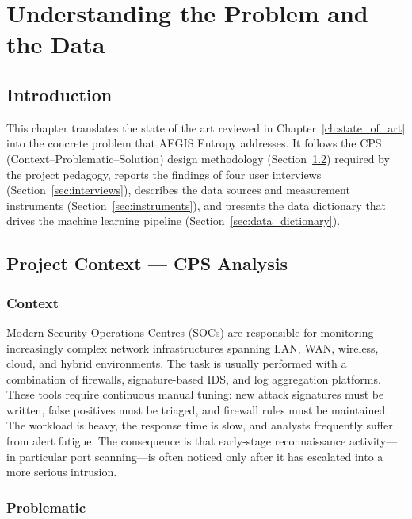 
\chapter{Understanding the Problem and the Data}\label{ch:understanding}

\section{Introduction}

This chapter translates the state of the art reviewed in Chapter~\ref{ch:state_of_art} into the concrete problem that AEGIS Entropy addresses. It follows the CPS (Context--Problematic--Solution) design methodology (Section~\ref{sec:cps}) required by the project pedagogy, reports the findings of four user interviews (Section~\ref{sec:interviews}), describes the data sources and measurement instruments (Section~\ref{sec:instruments}), and presents the data dictionary that drives the machine learning pipeline (Section~\ref{sec:data_dictionary}).

\section{Project Context --- CPS Analysis}\label{sec:cps}

\subsection{Context}

Modern Security Operations Centres (SOCs) are responsible for monitoring increasingly complex network infrastructures spanning LAN, WAN, wireless, cloud, and hybrid environments. The task is usually performed with a combination of firewalls, signature-based IDS, and log aggregation platforms. These tools require continuous manual tuning: new attack signatures must be written, false positives must be triaged, and firewall rules must be maintained. The workload is heavy, the response time is slow, and analysts frequently suffer from alert fatigue. The consequence is that early-stage reconnaissance activity---in particular port scanning---is often noticed only after it has escalated into a more serious intrusion.

\subsection{Problematic}

